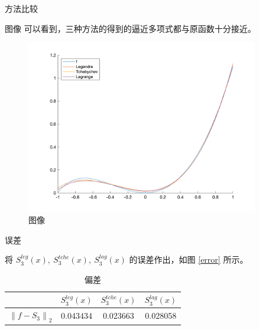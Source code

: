 \documentclass[a4paper]{article}
\begin{document}
\begin{multicols}{2}
\begin{section}{方法比较}
\begin{subsection}{图像}
		可以看到，三种方法的得到的逼近多项式都与原函数十分接近。
		
		\begin{figure}[ht] %
			\centering %
			\includegraphics[width = 0.9\textwidth]{img/plot.png} 
			\caption{图像}
			\label{plot} 
		\end{figure}	
		
	\end{subsection}
	
	\begin{subsection}{误差}
	
		将 $S_3^{leg}(x),\ S_3^{tche}(x),\ S_3^{lag}(x)$ 的误差作出，如图 \ref{error} 所示。
		
		\begin{table}[H]
		\begin{tabular}{c|c|c|c}
		\hline
		                         & $S_3^{leg}(x)$ & $S_3^{tche}(x)$ & $S_3^{lag}(x)$ \\ \hline
		$\left\|f-S_3\right\|_2$ & 0.043434       & 0.023663        & 0.028058      
		\end{tabular}
		\caption{偏差}
		\end{table}
		

\end{subsection}
\end{section}
\end{multicols}
\end{document}
